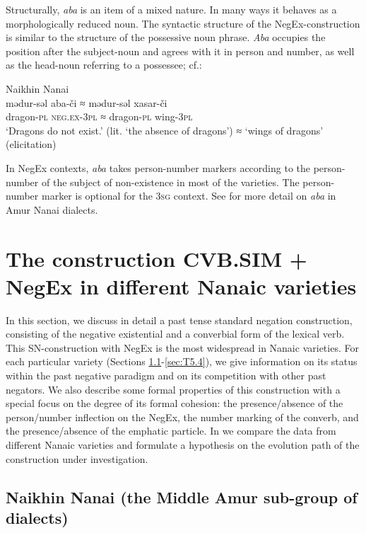 \documentclass[output=paper]{langscibook}
\begin{document}
Structurally, \textit{aba} is an item of a mixed nature. In many ways it behaves as a morphologically reduced noun. The syntactic structure of the NegEx-construction is similar to the structure of the possessive noun phrase. \textit{Aba} occupies the position after the subject-noun and agrees with it in person and number, as well as the head-noun referring to a possessee; cf.:

\ea Naikhin Nanai \label{ex:T8}\\
	\gll mədur-səl	aba-či	≈	mədur-səl	xasar-či\\
	dragon-\textsc{pl}	\textsc{neg.ex-3pl}	≈	dragon-\textsc{pl}	wing-\textsc{3pl}\\
	\glt `Dragons do not exist.' (lit. `the absence of dragons') ≈ `wings of dragons' (elicitation)
\z


In NegEx contexts, \textit{aba} takes person-number markers according to the person-number of the subject of non-existence in most of the varieties. The person-number marker is optional for the \textsc{3sg} context. See \citet{oskolskaya2015a} for more detail on \textit{aba} in Amur Nanai dialects.

\section{The construction CVB.SIM + NegEx in different Nanaic varieties}\label{sec:T5}

In this section, we discuss in detail a past tense standard negation construction, consisting of the negative existential and a converbial form of the lexical verb. This SN-construction with NegEx is the most widespread in Nanaic varieties. For each particular variety (Sections \ref{sec:T5.1}-\ref{sec:T5.4}), we give information on its status within the past negative paradigm and on its competition with other past negators. We also describe some formal properties of this construction with a special focus on the degree of its formal cohesion: the presence/absence of the person/number inflection on the NegEx, the number marking of the converb, and the presence/absence of the emphatic particle. In  we compare the data from different Nanaic varieties and formulate a hypothesis on the evolution path of the construction under investigation.

\subsection{Naikhin Nanai (the Middle Amur sub-group of dialects)}\label{sec:T5.1}
\end{document}
